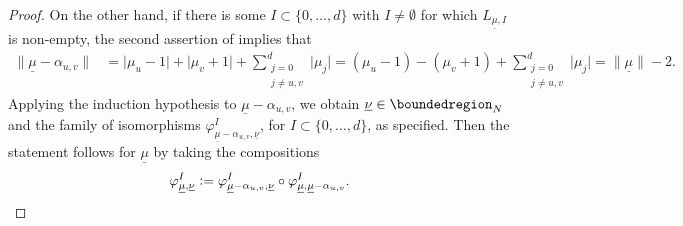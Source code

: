 \documentclass[a4paper, reqno, 10pt]{amsart}
\theoremstyle{definition}
\numberwithin{equation}{section}
\newcommand{\abs}[1]{{\lvert{#1}\rvert}}
\newcommand{\defeq}{\vcentcolon=}
\newcommand{\ul}[1]{{\underline{#1}}}
\begin{document}
\begin{proof}
	
	On the other hand, if there is some $I\subset \{0,\ldots,d\}$ with $I \neq \emptyset$ for which $L_{\ul{\mu},I}$ is non-empty, the second assertion of  implies that 
	\begin{align*}
		\lVert \ul{\mu}-\alpha_{u,v} \rVert 
		&= \abs{\mu_u -1} + \abs{\mu_v +1} + \sum_{\substack{j=0 \\ j\neq u,v}}^d \abs{\mu_j}
		= (\mu_u - 1) - (\mu_v +1) + \sum_{\substack{j=0 \\ j\neq u,v}}^d \abs{\mu_j}
		= \lVert \ul{\mu} \rVert - 2 .
	\end{align*}
	Applying the induction hypothesis to $\ul{\mu}- \alpha_{u,v}$, we obtain $\ul{\nu}\in \boundedregion_N$ and the family of isomorphisms $\varphi^I_{\ul{\mu}- \alpha_{u,v}, \ul{\nu}}$, for $I\subset \{0,\ldots,d\}$, as specified.
	Then the statement follows for $\ul{\mu}$ by taking the compositions
	\begin{equation*}
		\varphi^I_{\ul{\mu},\ul{\nu}} \defeq \varphi^I_{\ul{\mu}- \alpha_{u,v}, \ul{\nu}} \circ \varphi^I_{\ul{\mu},\ul{\mu}-\alpha_{u,v}} .
	\end{equation*}
\end{proof}
\end{document}
